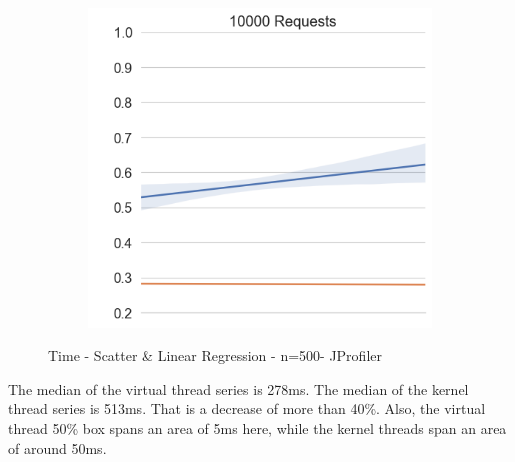 \begin{figure}[H]
\begin{subfigure}[b]{0.45\textwidth}
    \includegraphics[width=1.0\linewidth]{img/footprint/linres-500.png}
  \end{subfigure}
  \caption{Time - Scatter \& Linear Regression - n=500- JProfiler}
\end{figure}

The median of the virtual thread series is 278ms. The median of the kernel thread series is 513ms. That is a decrease of more than 40\%. Also, the virtual thread 50\% box spans an area of 5ms here, while the kernel threads span an area of around 50ms.

